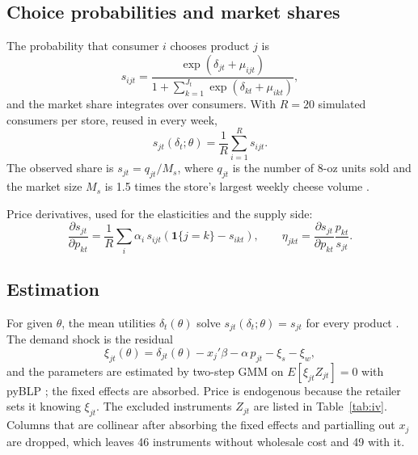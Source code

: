 \documentclass[11pt]{article}
\begin{document}
\subsection{Choice probabilities and market shares}\label{sec:shares}

The probability that consumer $i$ chooses product $j$ is
\begin{equation}
  s_{ijt} = \frac{\exp(\delta_{jt} + \mu_{ijt})}
                 {1 + \sum_{k=1}^{J_t} \exp(\delta_{kt} + \mu_{ikt})} ,
  \label{eq:prob}
\end{equation}
and the market share integrates over consumers. With $R = 20$ simulated consumers per store,
reused in every week,
\begin{equation}
  s_{jt}(\delta_t; \theta) = \frac{1}{R} \sum_{i=1}^{R} s_{ijt} .
  \label{eq:share}
\end{equation}
The observed share is $s_{jt} = q_{jt} / M_s$, where $q_{jt}$ is the number of 8-oz units
sold and the market size $M_s$ is 1.5 times the store's largest weekly cheese volume
\citep{millerweinberg2017}.

Price derivatives, used for the elasticities and the supply side:
\begin{equation}
  \frac{\partial s_{jt}}{\partial p_{kt}}
    = \frac{1}{R} \sum_{i} \alpha_i\, s_{ijt} \left( \mathbf{1}\{j = k\} - s_{ikt} \right),
  \qquad
  \eta_{jkt} = \frac{\partial s_{jt}}{\partial p_{kt}} \frac{p_{kt}}{s_{jt}} .
  \label{eq:deriv}
\end{equation}

\subsection{Estimation}

For given $\theta$, the mean utilities $\delta_t(\theta)$ solve
$s_{jt}(\delta_t; \theta) = s_{jt}$ for every product \citep[the contraction of][]{blp1995}.
The demand shock is the residual
\begin{equation}
  \xi_{jt}(\theta) = \delta_{jt}(\theta) - x_j'\beta - \alpha\, p_{jt} - \xi_s - \xi_w ,
\end{equation}
and the parameters are estimated by two-step GMM on $E[\xi_{jt} Z_{jt}] = 0$ with pyBLP
\citep{conlon2020}; the fixed effects are absorbed. Price is endogenous because the retailer
sets it knowing $\xi_{jt}$. The excluded instruments $Z_{jt}$ are listed in
Table~\ref{tab:iv}. Columns that are collinear after absorbing the fixed effects and
partialling out $x_j$ are dropped, which leaves 46 instruments without wholesale cost and 49
with it.
\end{document}
